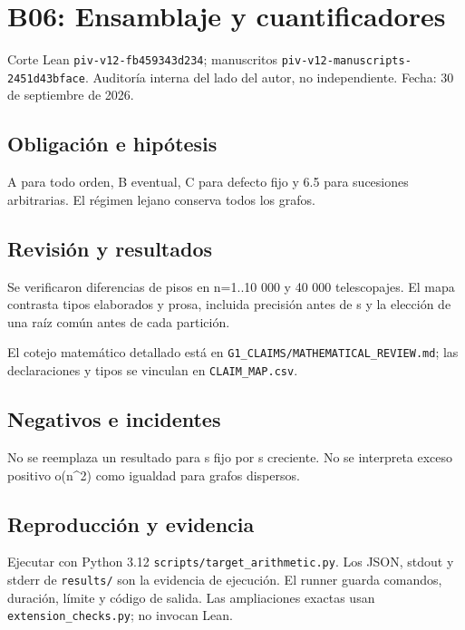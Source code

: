 \documentclass[11pt]{article}
\begin{document}
\section{B06: Ensamblaje y
cuantificadores}\label{b06-ensamblaje-y-cuantificadores}

Corte Lean \nolinkurl{piv-v12-fb459343d234}; manuscritos
\nolinkurl{piv-v12-manuscripts-2451d43bface}. Auditoría interna del lado
del autor, no independiente. Fecha: 30 de septiembre de 2026.

\subsection{Obligación e hipótesis}\label{obligaciuxf3n-e-hipuxf3tesis}

A para todo orden, B eventual, C para defecto fijo y 6.5 para sucesiones
arbitrarias. El régimen lejano conserva todos los grafos.

\subsection{Revisión y resultados}\label{revisiuxf3n-y-resultados}

Se verificaron diferencias de pisos en n=1..10 000 y 40 000
telescopajes. El mapa contrasta tipos elaborados y prosa, incluida
precisión antes de s y la elección de una raíz común antes de cada
partición.

El cotejo matemático detallado está en
\nolinkurl{G1_CLAIMS/MATHEMATICAL_REVIEW.md}; las declaraciones y tipos
se vinculan en \nolinkurl{CLAIM_MAP.csv}.

\subsection{Negativos e incidentes}\label{negativos-e-incidentes}

No se reemplaza un resultado para s fijo por s creciente. No se
interpreta exceso positivo o(n\^{}2) como igualdad para grafos
dispersos.

\subsection{Reproducción y evidencia}\label{reproducciuxf3n-y-evidencia}

Ejecutar con Python 3.12 \nolinkurl{scripts/target_arithmetic.py}. Los
JSON, stdout y stderr de \nolinkurl{results/} son la evidencia de
ejecución. El runner guarda comandos, duración, límite y código de
salida. Las ampliaciones exactas usan \nolinkurl{extension_checks.py}; no
invocan Lean.
\end{document}

